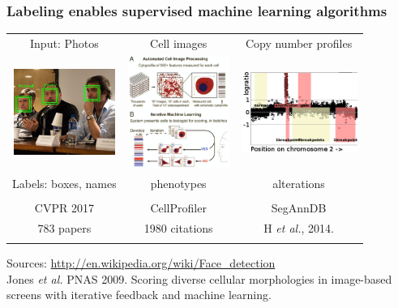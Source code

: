 \documentclass{beamer}
\begin{document}
\begin{frame}
  \frametitle{Labeling enables supervised machine learning algorithms}
  \begin{tabular}{ccc}
    Input: Photos & Cell images & Copy number profiles \\
    \includegraphics[width=1.3in]{faces} &
    \includegraphics[width=1.3in]{cellprofiler} &
    \includegraphics[width=1.5in]{regions-axes}\\
    Labels: boxes, names & phenotypes & alterations \\ \\
CVPR 2017
 & CellProfiler & SegAnnDB \\
783 papers
 & 
1980 citations
 & H {\it et al.}, 2014. \\
     &
  \end{tabular}
  Sources: \url{http://en.wikipedia.org/wiki/Face_detection}\\
  Jones {\it et al.} PNAS 2009. Scoring diverse cellular morphologies in
  image-based screens with iterative feedback and machine learning.
\end{frame}
\end{document}
